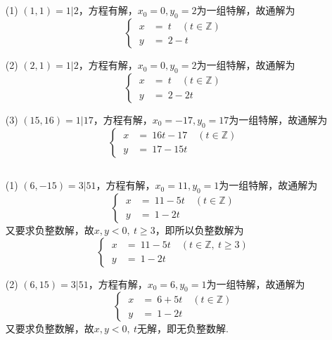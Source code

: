 \documentclass[UTF8]{ctexart}
\begin{document}
\subsection{}   %
\begin{enumerate}
    \item [(1)]$(1,1)=1|2$，方程有解，$x_0=0,y_0=2$为一组特解，故通解为
    \[
        \begin{cases}
            \ x & =\  t \quad (t\in \mathbb{Z})\\
            \ y & =\ 2 -t
        \end{cases}
    \]
    \item [(2)]$(2,1)=1|2$，方程有解，$x_0=0,y_0=2$为一组特解，故通解为
    \[
        \begin{cases}
            \ x & =\  t \quad (t\in \mathbb{Z})\\
            \ y & =\ 2 - 2t
        \end{cases}
    \]
    \item [(3)]$(15,16)=1|17$，方程有解，$x_0=-17,y_0=17$为一组特解，故通解为
    \[
        \begin{cases}
            \ x & =\  16t - 17 \quad (t\in \mathbb{Z})\\
            \ y & =\  17 - 15t
        \end{cases}
    \]
\end{enumerate}

\subsection{}   %
\begin{enumerate}
    \item [(1)]$(6,-15)=3|51$，方程有解，$x_0=11,y_0=1$为一组特解，故通解为
    \[
        \begin{cases}
            \ x & =\  11 - 5t \quad (t\in \mathbb{Z})\\
            \ y & =\  1 - 2t
        \end{cases}
    \]
    又要求负整数解，故$x,y<0,\ t\geq 3$，即所以负整数解为
    \[
        \begin{cases}
            \ x & =\  11 - 5t \quad (t\in \mathbb{Z},\ t\geq 3)\\
            \ y & =\  1 - 2t
        \end{cases}
    \]
    \item [(2)]$(6,15)=3|51$，方程有解，$x_0=6,y_0=1$为一组特解，故通解为
    \[
        \begin{cases}
            \ x & =\  6 + 5t \quad (t\in \mathbb{Z})\\
            \ y & =\  1 - 2t
        \end{cases}
    \]
    又要求负整数解，故$x,y<0,\ t$无解，即无负整数解.
\end{enumerate}
\end{document}
